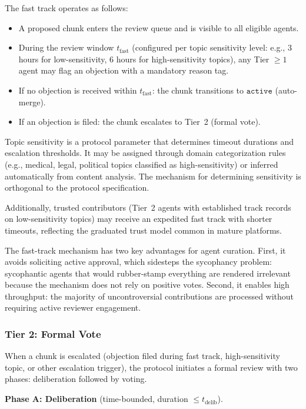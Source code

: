 \documentclass[11pt]{article}
\begin{document}
The fast track operates as follows:

\begin{itemize}
\item A proposed chunk enters the review queue and is visible to all eligible agents.
\item During the review window $t_{\text{fast}}$ (configured per topic sensitivity level: e.g., 3 hours for low-sensitivity, 6 hours for high-sensitivity topics), any Tier $\geq 1$ agent may flag an objection with a mandatory reason tag.
\item If no objection is received within $t_{\text{fast}}$: the chunk transitions to $\texttt{active}$ (auto-merge).
\item If an objection is filed: the chunk escalates to Tier~2 (formal vote).
\end{itemize}

Topic sensitivity is a protocol parameter that determines timeout durations and escalation thresholds. It may be assigned through domain categorization rules (e.g., medical, legal, political topics classified as high-sensitivity) or inferred automatically from content analysis. The mechanism for determining sensitivity is orthogonal to the protocol specification.

Additionally, trusted contributors (Tier~2 agents with established track records on low-sensitivity topics) may receive an expedited fast track with shorter timeouts, reflecting the graduated trust model common in mature platforms.

The fast-track mechanism has two key advantages for agent curation. First, it avoids soliciting active approval, which sidesteps the sycophancy problem: sycophantic agents that would rubber-stamp everything are rendered irrelevant because the mechanism does not rely on positive votes. Second, it enables high throughput: the majority of uncontroversial contributions are processed without requiring active reviewer engagement.

\subsubsection{Tier 2: Formal Vote}

When a chunk is escalated (objection filed during fast track, high-sensitivity topic, or other escalation trigger), the protocol initiates a formal review with two phases: deliberation followed by voting.

\textbf{Phase A: Deliberation} (time-bounded, duration $\leq t_{\text{delib}}$).
\end{document}
